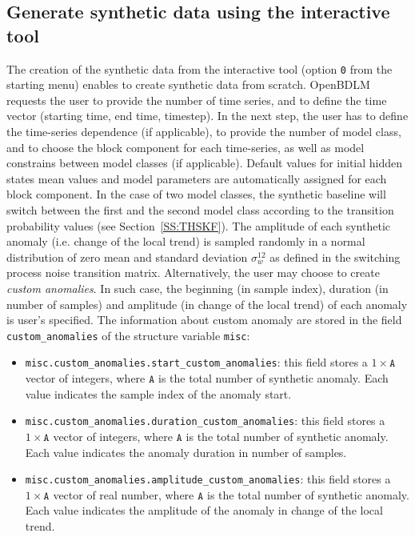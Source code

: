 \subsection{Generate synthetic data using the interactive tool}
The creation of the synthetic data from the interactive tool (option \colorbox{light-gray}{\lstinline[basicstyle = \mlttfamily \small, backgroundcolor = \color{light-gray}]!0!} from the starting menu) enables to create synthetic data from scratch. 
OpenBDLM requests the user to provide the number of time series, and to define the time vector (starting time, end time, timestep).
In the next step, the user has to define the time-series dependence (if applicable), to provide the number of model class, and to choose the block component for each time-series, as well as model constrains between model classes (if applicable).
Default values for initial hidden states mean values and model parameters are automatically assigned for each block component.
In the case of two model classes, the synthetic baseline will switch between the first and the second model class according to the transition probability values (see Section~\ref{SS:THSKF}).
The amplitude of each synthetic anomaly (i.e. change of the local trend) is sampled randomly in a normal distribution of zero mean and standard deviation $\sigma_{w}^{12}$ as defined in the switching process noise transition matrix.
Alternatively, the user may choose to create \emph{custom anomalies}.
In such case, the beginning (in sample index), duration (in number of samples) and amplitude (in change of the local trend) of each anomaly is user's specified.
The information about custom anomaly are stored in the field \lstinline[basicstyle = \mlttfamily \small, backgroundcolor = \color{light-gray}]!custom_anomalies! of the structure variable \lstinline[basicstyle = \mlttfamily \small, backgroundcolor = \color{light-gray}]!misc!:
\begin{itemize}
\item \lstinline[basicstyle = \mlttfamily \small, backgroundcolor = \color{light-gray}]!misc.custom_anomalies.start_custom_anomalies!: this field stores a $1\times \mathtt{A}$ vector of integers, where $\mathtt{A}$ is the total number of synthetic anomaly. Each value indicates the sample index of the anomaly start.
\item \lstinline[basicstyle = \mlttfamily \small, backgroundcolor = \color{light-gray}]!misc.custom_anomalies.duration_custom_anomalies!: this field stores a $1\times \mathtt{A}$ vector of integers, where $\mathtt{A}$ is the total number of synthetic anomaly. Each value indicates the anomaly duration in number of samples.
\item \lstinline[basicstyle = \mlttfamily \small, backgroundcolor = \color{light-gray}]!misc.custom_anomalies.amplitude_custom_anomalies!: this field stores a $1\times \mathtt{A}$ vector of real number, where $\mathtt{A}$ is the total number of synthetic anomaly. Each value indicates the amplitude of the anomaly in change of the local trend.
\end{itemize}
